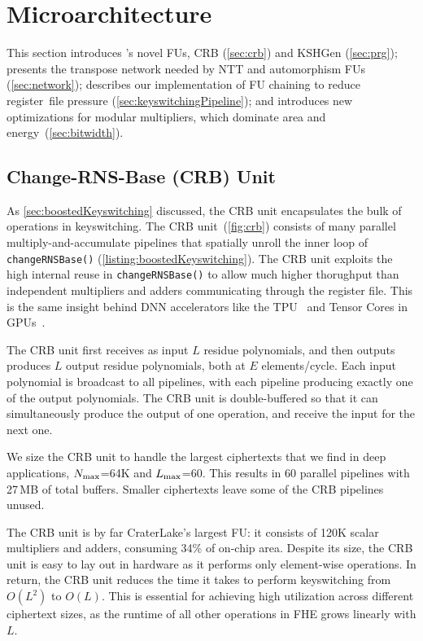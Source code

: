 \section{Microarchitecture}\label{sec:architecture}

This section introduces \name's novel FUs, CRB (\autoref{sec:crb}) and KSHGen
(\autoref{sec:prg}); presents the transpose network needed by NTT and
automorphism FUs (\autoref{sec:network}); describes our implementation of FU
chaining to reduce register~file pressure (\autoref{sec:keyswitchingPipeline});
and introduces new optimizations for modular multipliers, which dominate area
and energy~(\autoref{sec:bitwidth}).

\subsection{Change-RNS-Base (CRB) Unit}\label{sec:crb}

As \autoref{sec:boostedKeyswitching} discussed, the CRB unit encapsulates the bulk of
operations in keyswitching. The CRB unit~(\autoref{fig:crb}) consists of many
parallel multiply-and-accumulate pipelines that spatially unroll the inner loop
of \verb!changeRNSBase()! (\autoref{listing:boostedKeyswitching}). The CRB unit
exploits the high internal reuse in \verb!changeRNSBase()! to allow much higher
thorughput than independent multipliers and adders communicating through the
register file. This is the same insight behind DNN accelerators like the
TPU~\cite{jouppi:isca17:tpu} and Tensor Cores in
GPUs~\cite{choquette2021nvidia}.

The CRB unit first receives as input $L$ residue polynomials, and then outputs
produces $L$ output residue polynomials, both at $E$ elements/cycle. Each input
polynomial is broadcast to all pipelines, with each pipeline producing exactly
one of the output polynomials. The CRB unit is double-buffered so that it can
simultaneously produce the output of one operation, and receive the input for
the next one.

We size the CRB unit to handle the largest ciphertexts that we find in deep
applications, $N_{\textrm{max}}$=64K and $L_{\textrm{max}}$=60. This results in 60 parallel pipelines
with 27\,MB of total buffers. Smaller ciphertexts leave some of the CRB
pipelines unused.

\figCRB

The CRB unit is by far CraterLake's largest FU: it consists of 120K scalar
multipliers and adders, consuming 34\% of on-chip area. Despite its size, the
CRB unit is easy to lay out in hardware as it performs only element-wise
operations. In return, the CRB unit reduces the time it takes to perform
keyswitching from $O(L^2)$ to $O(L)$. This is essential for achieving high
utilization across different ciphertext sizes, as the runtime of all other
operations in FHE grows linearly with $L$.

